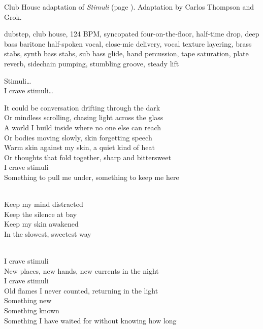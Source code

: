 
\begin{notes}
Club House adaptation of \emph{Stimuli}  (page \pageref{sec:stimuli}). Adaptation by Carlos Thompson and Grok.
\end{notes}
\begin{style}
dubstep, club house, 124 BPM, syncopated four-on-the-floor, half-time drop, deep bass baritone half-spoken vocal, close-mic delivery, vocal texture layering, brass stabs, synth bass stabs, sub bass glide, hand percussion, tape saturation, plate reverb, sidechain pumping, stumbling groove, steady lift
\end{style}
\begin{lyrics}
Stimuli…\\
I crave stimuli…

It could be conversation drifting through the dark\\
Or mindless scrolling, chasing light across the glass\\
A world I build inside where no one else can reach\\
Or bodies moving slowly, skin forgetting speech\\
Warm skin against my skin, a quiet kind of heat\\
Or thoughts that fold together, sharp and bittersweet\\
I crave stimuli\\
Something to pull me under, something to keep me here

\\
Keep my mind distracted\\
Keep the silence at bay\\
Keep my skin awakened\\
In the slowest, sweetest way

\\
I crave stimuli\\
New places, new hands, new currents in the night\\
I crave stimuli\\
Old flames I never counted, returning in the light\\
Something new\\
Something known\\
Something I have waited for without knowing how long


\end{lyrics}
